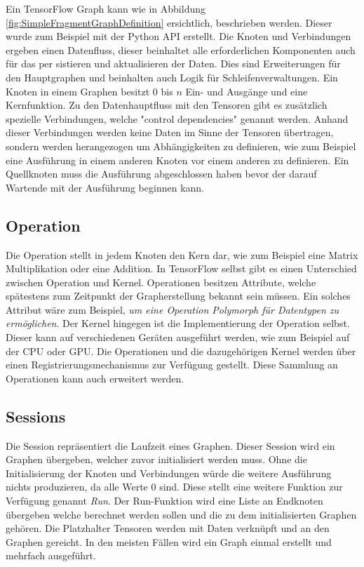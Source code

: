 Ein TensorFlow Graph kann wie in Abbildung \ref{fig:SimpleFragmentGraphDefinition} ersichtlich, beschrieben werden.
Dieser wurde zum Beispiel mit der Python API erstellt.
Die Knoten und Verbindungen ergeben einen Datenfluss, dieser beinhaltet alle erforderlichen Komponenten auch für das per sistieren und aktualisieren der Daten.
Dies sind Erweiterungen für den Hauptgraphen und beinhalten auch Logik für Schleifenverwaltungen.
Ein Knoten in einem Graphen besitzt $0$ bis $n$ Ein- und Ausgänge und eine Kernfunktion. 
Zu den Datenhauptfluss mit den Tensoren gibt es zusätzlich spezielle Verbindungen, welche "control dependencies"  genannt werden. 
Anhand dieser Verbindungen werden keine Daten im Sinne der Tensoren übertragen, sondern werden herangezogen um Abhängigkeiten zu definieren, wie zum Beispiel eine Ausführung in einem anderen Knoten vor einem anderen zu definieren.
Ein Quellknoten muss die Ausführung abgeschlossen haben bevor der darauf Wartende  mit der Ausführung beginnen kann. \cite{wp2015tensorflow}

\subsection{Operation}

Die Operation stellt in jedem Knoten den Kern dar, wie zum Beispiel eine Matrix Multiplikation oder eine Addition.
In TensorFlow selbst gibt es einen Unterschied zwischen Operation und Kernel.
Operationen besitzen Attribute, welche spätestens zum Zeitpunkt der Grapherstellung bekannt sein müssen. 
Ein solches Attribut wäre zum Beispiel, \textit{um eine Operation Polymorph für Datentypen zu ermöglichen}. 
Der Kernel hingegen ist die Implementierung der Operation selbst. 
Dieser kann auf verschiedenen Geräten ausgeführt werden, wie zum Beispiel auf der CPU oder GPU.
Die Operationen und die dazugehörigen Kernel werden über einen Registrierungsmechanismus zur Verfügung gestellt. 
Diese Sammlung an Operationen kann auch erweitert werden. \cite{wp2015tensorflow} 

\subsection{Sessions}

Die Session repräsentiert die Laufzeit eines Graphen. 
Dieser Session wird ein Graphen übergeben, welcher zuvor initialisiert werden muss. 
Ohne die Initialisierung der Knoten und Verbindungen würde die weitere Ausführung nichts produzieren, da alle Werte $0$ sind. 
Diese stellt eine weitere Funktion zur Verfügung genannt \textit{Run}. 
Der Run-Funktion wird eine Liste an Endknoten übergeben welche berechnet werden sollen und die zu dem initialisierten Graphen gehören. 
Die Platzhalter Tensoren werden mit Daten verknüpft und an den Graphen gereicht. 
In den meisten Fällen wird ein Graph einmal erstellt und mehrfach ausgeführt. \cite{wp2015tensorflow} 

